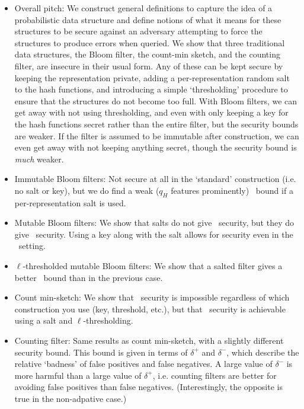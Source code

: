 \begin{itemize}
  \item Overall pitch: We construct general definitions to capture the idea of a
  probabilistic data structure and define notions of what it means for these
  structures to be secure against an adversary attempting to force the
  structures to produce errors when queried. We show that three traditional data
  structures, the Bloom filter, the count-min sketch, and the counting filter,
  are insecure in their usual form. Any of these can be kept secure by keeping
  the representation private, adding a per-representation random salt to the
  hash functions, and introducing a simple `thresholding' procedure to ensure
  that the structures do not become too full. With Bloom filters, we can get
  away with not using thresholding, and even with only keeping a key
  for the hash functions secret rather than the entire filter, but the
  security bounds are weaker. If the filter is assumed to be immutable after
  construction, we can even get away with not keeping anything secret, though
  the security bound is \emph{much} weaker.
  \item Immutable Bloom filters: Not secure at all in the `standard'
  construction (i.e. no salt or key), but we do find a weak ($q_H$ features
  prominently) \errep\ bound if a per-representation salt is used.
  \item Mutable Bloom filters: We show that salts do not give \errep\ security,
  but they do give \erreps\ security. Using a key along with the salt allows for
  security even in the \errep\ setting.
  \item $\ell$-thresholded mutable Bloom filters: We show that a salted filter
  gives a better \erreps\ bound than in the previous case.
  \item Count min-sketch: We show that \errep\ security is impossible regardless
  of which construction you use (key, threshold, etc.), but that \erreps\
  security is achievable using a salt and $\ell$-thresholding.
  \item Counting filter: Same results as count min-sketch, with a slightly
  different security bound. This bound is given in terms of $\delta^+$ and
  $\delta^-$, which describe the relative `badness' of false positives and
  false negatives. A large value of $\delta^-$ is more harmful than a large
  value of $\delta^+$, i.e. counting filters are better for avoiding false
  positives than false negatives. (Interestingly, the opposite is true in the
  non-adpative case.)
\end{itemize}

